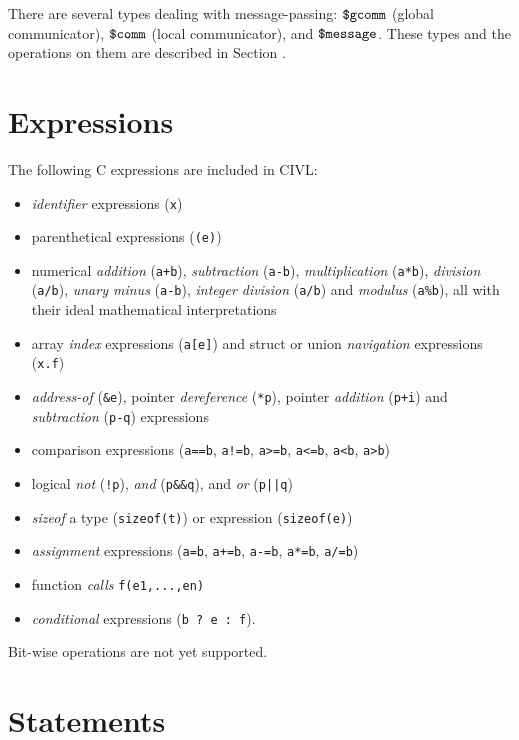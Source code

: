 There are several types dealing with message-passing: $\mbox{\texttt{\${}gcomm}}$
(global communicator), $\mbox{\texttt{\${}comm}}$ (local communicator), and $\mbox{\texttt{\${}message}}$.
These types and the operations on them are described in Section
\label{sec:communicators}.


\section{Expressions}

The following C expressions are included in CIVL: 
\begin{itemize}
\item \emph{identifier} expressions (\texttt{x})
\item parenthetical expressions (\verb!(e)!)
\item numerical \emph{addition} (\verb!a+b!), \emph{subtraction} (\verb!a-b!),
  \emph{multiplication} (\verb!a*b!), \emph{division} (\verb!a/b!),
  \emph{unary minus} (\verb!a-b!),
  \emph{integer division} (\verb!a/b!) and \emph{modulus} (\verb!a%b!),
  all with their ideal mathematical interpretations
\item array \emph{index} expressions (\verb!a[e]!) and struct or union
  \emph{navigation} expressions (\verb!x.f!)
\item \emph{address-of} (\verb!&e!), pointer \emph{dereference} (\verb!*p!),
  pointer \emph{addition} (\verb!p+i!) and \emph{subtraction} (\verb!p-q!)
  expressions
\item comparison expressions (\verb!a==b!, \verb~a!=b~, \verb!a>=b!,
  \verb!a<=b!, \verb!a<b!, \verb!a>b!)
\item logical \emph{not} (\verb~!p~), \emph{and} (\verb!p&&q!), and
  \emph{or} (\verb!p||q!)
\item \emph{sizeof} a type (\verb!sizeof(t)!) or expression (\verb!sizeof(e)!)
\item \emph{assignment} expressions (\verb!a=b!, \verb!a+=b!, \verb!a-=b!,
  \verb!a*=b!, \verb!a/=b!)
\item function \emph{calls} \verb!f(e1,...,en)!
\item \emph{conditional} expressions (\verb!b ? e : f!).
\end{itemize}

Bit-wise operations are not yet supported.

\section{Statements}

